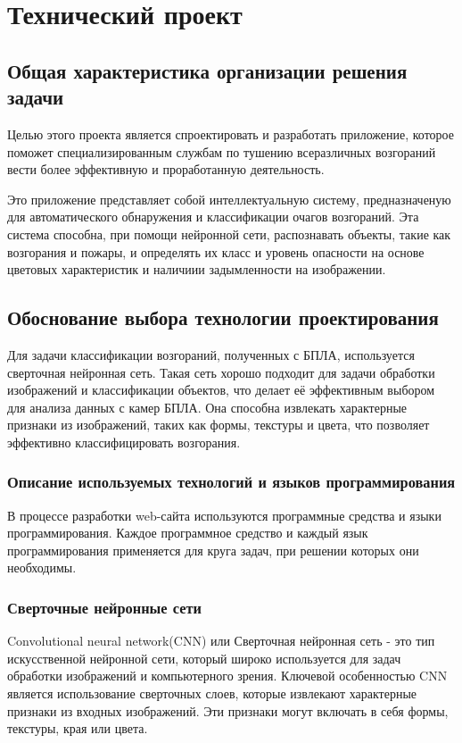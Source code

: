 \section{Технический проект}
\subsection{Общая характеристика организации решения задачи}

Целью этого проекта является спроектировать и разработать приложение, которое поможет специализированным службам по тушению всеразличных возгораний вести более эффективную и проработанную деятельность.

Это приложение представляет собой интеллектуальную систему, предназначеную для автоматического обнаружения и классификации очагов возгораний. Эта система способна, при помощи нейронной сети, распознавать объекты, такие как возгорания и пожары, и определять их класс и уровень опасности на основе цветовых характеристик и наличиии задымленности на изображении.

\subsection{Обоснование выбора технологии проектирования}

Для задачи классификации возгораний, полученных с БПЛА, используется сверточная нейронная сеть. Такая сеть хорошо подходит для задачи обработки изображений и классификации объектов, что делает её эффективным выбором для анализа данных с камер БПЛА. Она способна извлекать характерные признаки из изображений, таких как формы, текстуры и цвета, что позволяет эффективно классифицировать возгорания.

\subsubsection{Описание используемых технологий и языков программирования}

В процессе разработки web-сайта используются программные средства и языки программирования. Каждое программное средство и каждый язык программирования применяется для круга задач, при решении которых они необходимы.

\subsubsection{Сверточные нейронные сети}

Convolutional neural network(CNN) или Сверточная нейронная сеть - это тип искусственной нейронной сети, который широко используется для задач обработки изображений и компьютерного зрения. Ключевой особенностью CNN является использование сверточных слоев, которые извлекают характерные признаки из входных изображений. Эти признаки могут включать в себя формы, текстуры, края или цвета.

